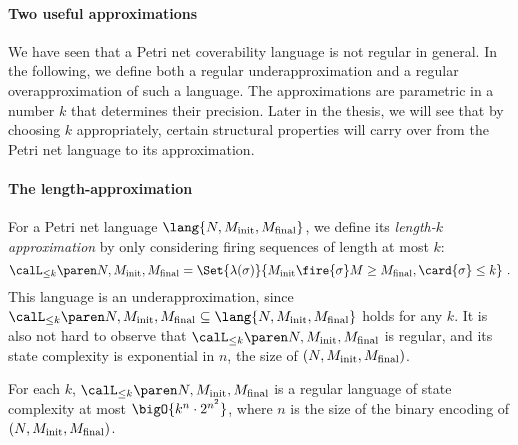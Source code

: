 \documentclass[../../diss.tex]{subfiles}
\begin{document}
\paragraph{Two useful approximations}

We have seen that a Petri net coverability language is not regular in general.
In the following, we define both a regular underapproximation and a regular overapproximation of such a language.
The approximations are parametric in a number $k$ that determines their precision.
Later in the thesis, we will see that by choosing $k$ appropriately, certain structural properties will carry over from the Petri net language to its approximation.

\paragraph{The length-approximation}

For a Petri net language $\lang{N,\Minit,\Mfinal}$, we define its \emph{length-$k$ approximation} by only considering firing sequences of length at most $k$:
\[
    \languak{k}{N,\Minit,\Mfinal}
    =
    \Set{ \lambda(\sigma) }{ \Minit \fire{\sigma} M \geq \Mfinal, \card{\sigma} \leq k}
    \ .
\]
This language is an underapproximation, since $\languak{k}{N,\Minit,\Mfinal} \subseteq \lang{N,\Minit,\Mfinal}$ holds for any $k$.
It is also not hard to observe that $\languak{k}{N,\Minit,\Mfinal}$ is regular, and its state complexity is exponential in $n$, the size of $(N,M_{\text{init}},M_{\text{final}})$.

\begin{proposition}%
\label{Proposition:PNLengthkApprox}%
    For each $k$, $\languak{k}{N,\Minit,\Mfinal}$ is a regular language of state complexity at most $\bigO{k^n \cdot 2^{n^2}}$, where $n$ is the size of the binary encoding of $(N,M_{\text{init}},M_{\text{final}})$.
\end{proposition}
\end{document}
